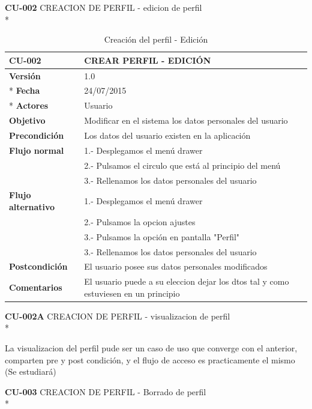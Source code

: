 \documentclass[../pfc.tex]{subfiles}
\begin{document}
	\textbf{CU-002}	CREACION DE PERFIL - edicion de perfil\\*
	
	
	\begin{table}[!hbt]
		\centering
		\begin{tabular}[t]{|p{3cm}|p{9.5cm}|}
			\hline \textbf{CU-002} & \textbf{CREAR PERFIL - EDICIÓN} \\*
			\hline\hline \textbf{Versión} & 1.0 \\ *
			\hline\hline \textbf{Fecha} & 24/07/2015 \\ *
			\hline\textbf{Actores} 	& Usuario\\*
			\hline \textbf{Objetivo} & Modificar en el sistema los datos personales del usuario\\* 			
			\hline \textbf{Precondición} & Los datos del usuario existen en la aplicación \\* 
			\hline \textbf{Flujo normal} & 1.- Desplegamos el menú drawer \\* 
			& 2.- Pulsamos el circulo que está al principio del menú \\*	
			& 3.- Rellenamos los datos personales del usuario\\*	
			\hline \textbf{Flujo alternativo} & 1.- Desplegamos el menú drawer \\* 
			& 2.- Pulsamos la opcion ajustes \\*	
			& 3.- Pulsamos la opción en pantalla "Perfil" \\*	
			& 3.- Rellenamos los datos personales del usuario \\*	
			\hline \textbf{Postcondición} & El usuario posee sus datos personales modificados\\* 
			\hline \textbf{Comentarios}   & El usuario puede a su eleccion dejar los dtos tal y como estuviesen en un principio\\*
			\hline
		\end{tabular}
		\caption{Creación del perfil - Edición}
		\label{tabla:caso002}
	\end{table}
	
	
	\textbf{CU-002A}	CREACION DE PERFIL - visualizacion de perfil\\*

	La visualizacion del perfil pude ser un caso de uso que converge con el anterior, comparten pre y post condición, y el flujo de acceso es practicamente el mismo (Se estudiará)


		
	\textbf{CU-003}	CREACION DE PERFIL - Borrado de perfil\\*
\end{document}
